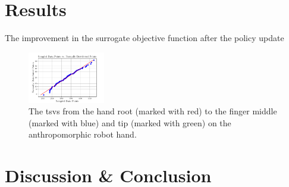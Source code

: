 \section{Results}\label{3-in-hand-manipulation-results}
The improvement in the surrogate objective function after the policy update

\begin{figure}[!h]
	\begin{center}
		\includegraphics[width=0.3\textwidth]{chapters/3-in-hand-manipulation/fig/stochastic-policy-over-epochs.pdf}
	\end{center}
	\caption{The \gls{tsv}s from the hand root (marked with red) to the finger middle (marked with blue) and tip (marked with green) on the anthropomorphic robot hand.}
	\label{fig:stochastic-policy-over-epochs}
\end{figure}

\section{Discussion \& Conclusion}



